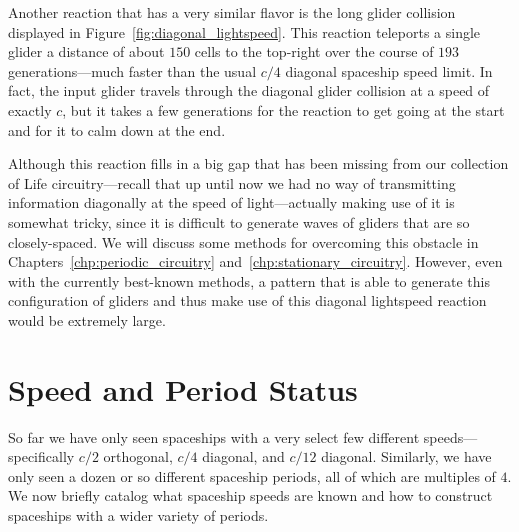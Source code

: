 Another reaction that has a very similar flavor is the long glider collision displayed in Figure~\ref{fig:diagonal_lightspeed}. This reaction teleports a single glider a distance of about $150$ cells to the top-right over the course of $193$ generations---much faster than the usual $c/4$ diagonal spaceship speed limit. In fact, the input glider travels through the diagonal glider collision at a speed of exactly $c$, but it takes a few generations for the reaction to get going at the start and for it to calm down at the end.

Although this reaction fills in a big gap that has been missing from our collection of Life circuitry---recall that up until now we had no way of transmitting information diagonally at the speed of light---actually making use of it is somewhat tricky, since it is difficult to generate waves of gliders that are so closely-spaced. We will discuss some methods for overcoming this obstacle in Chapters~\ref{chp:periodic_circuitry} and~\ref{chp:stationary_circuitry}. However, even with the currently best-known methods, a pattern that is able to generate this configuration of gliders and thus make use of this diagonal lightspeed reaction would be extremely large.



\clearpage%

\section{Speed and Period Status}\label{sec:speed_period_status}

So far we have only seen spaceships with a very select few different speeds---specifically $c/2$ orthogonal, $c/4$ diagonal, and $c/12$ diagonal. Similarly, we have only seen a dozen or so different spaceship periods, all of which are multiples of $4$. We now briefly catalog what spaceship speeds are known and how to construct spaceships with a wider variety of periods.

